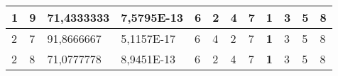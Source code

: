 \documentclass[conference]{IEEEtran}
\begin{document}
\begin{table*}[]
\begin{tabular}{|llll|llllllll|}
\multicolumn{1}{|l|}{1}                                                     & \multicolumn{1}{l|}{9}                                                        & \multicolumn{1}{l|}{71,4333333}                                                   & 7,5795E-13                     & \multicolumn{1}{l|}{6}                                                  & \multicolumn{1}{l|}{2}                                                  & \multicolumn{1}{l|}{4}                                                  & \multicolumn{1}{l|}{7}                                                  & \multicolumn{1}{l|}{\textbf{1}}                                         & \multicolumn{1}{l|}{3}                                                  & \multicolumn{1}{l|}{5}                                                  & 8                          \\ \hline
\multicolumn{1}{|l|}{2}                                                     & \multicolumn{1}{l|}{7}                                                        & \multicolumn{1}{l|}{91,8666667}                                                   & 5,1157E-17                     & \multicolumn{1}{l|}{6}                                                  & \multicolumn{1}{l|}{4}                                                  & \multicolumn{1}{l|}{2}                                                  & \multicolumn{1}{l|}{7}                                                  & \multicolumn{1}{l|}{\textbf{1}}                                         & \multicolumn{1}{l|}{3}                                                  & \multicolumn{1}{l|}{5}                                                  & 8                          \\ \hline
\multicolumn{1}{|l|}{2}                                                     & \multicolumn{1}{l|}{8}                                                        & \multicolumn{1}{l|}{71,0777778}                                                   & 8,9451E-13                     & \multicolumn{1}{l|}{6}                                                  & \multicolumn{1}{l|}{2}                                                  & \multicolumn{1}{l|}{4}                                                  & \multicolumn{1}{l|}{7}                                                  & \multicolumn{1}{l|}{\textbf{1}}                                         & \multicolumn{1}{l|}{3}                                                  & \multicolumn{1}{l|}{5}                                                  & 8                          \\ \hline

\end{tabular}
\end{table*}
\end{document}
